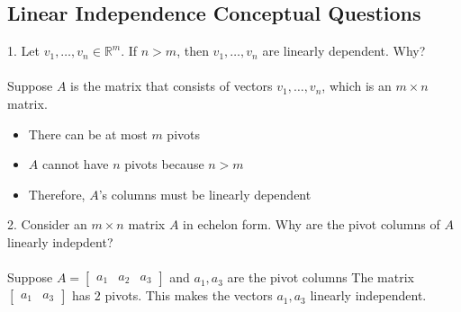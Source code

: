 \subsection{Linear Independence Conceptual Questions}
1. Let $v_1, \dots, v_n \in \mathbb{R}^m$. If $n > m$, then $v_1, \dots, v_n$ are linearly 
dependent. Why?
\\\\
Suppose $A$ is the matrix that consists of vectors $v_1, \dots, v_n$, which is an 
$m \times n$ matrix. 
\begin{itemize}
  \item There can be at most $m$ pivots
  \item $A$ cannot have $n$ pivots because $n > m$ 
  \item Therefore, $A$'s columns must be linearly dependent 
\end{itemize}
2. Consider an $m \times n$ matrix $A$ in echelon form. Why are the pivot columns of $A$ 
linearly indepdent? \\\\
Suppose $A = \begin{bmatrix}a_1 & a_2 & a_3\end{bmatrix}$ and $a_1, a_3$ are the pivot columns 
The matrix $\begin{bmatrix} a_1 & a_3\end{bmatrix}$ has $2$ pivots. This makes the vectors 
$a_1, a_3$ linearly independent. 
